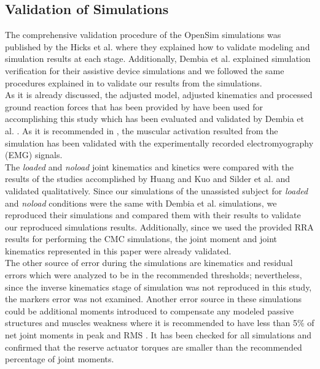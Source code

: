 \documentclass[10pt,letterpaper]{article}
\begin{document}
\subsection*{Validation of Simulations}
The comprehensive validation procedure of the OpenSim simulations was published by the Hicks et al. \cite{92} where they explained how to validate modeling and simulation results at each stage. Additionally, Dembia et al. \cite{93} explained simulation verification for their assistive device simulations and we followed the same procedures explained in \cite{92,93} to validate our results from the simulations.\\
As it is already discussed, the adjusted model, adjusted kinematics and processed ground reaction forces that has been provided by \cite{93} have been used for accomplishing this study which has been evaluated and validated by Dembia et al. \cite{93}. As it is recommended in \cite{92}, the muscular activation resulted from the simulation has been validated with the experimentally recorded electromyography (EMG) signals.\\
The \textit{loaded} and \textit{\textit{noload}} joint kinematics and kinetics were compared with the results of the studies accomplished by Huang and Kuo \cite{131} and Silder et al.\cite{132} and validated qualitatively. Since our simulations of the unassisted subject for \textit{loaded} and \textit{noload} conditions were the same with Dembia et al. simulations, we reproduced their simulations and compared them with their results to validate our reproduced simulations results. Additionally, since we used the provided RRA results for performing the CMC simulations, the joint moment and joint kinematics represented in this paper were already validated.\\
The other source of error during the simulations are kinematics and residual errors which were analyzed to be in the recommended thresholds\cite{92}; nevertheless, since the inverse kinematics stage of simulation was not reproduced in this study, the markers error was not examined. Another error source in these simulations could be additional moments introduced to compensate any modeled passive structures and muscles weakness where it is recommended to have less than 5\% of net joint moments in peak and RMS \cite{92}. It has been checked for all simulations and confirmed that the reserve actuator torques are smaller than the recommended percentage of joint moments.
\end{document}
